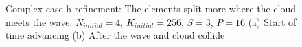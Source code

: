 \begin{figure}[H]
    \centering
    \hfill
    \caption{Complex case h-refinement: The elements split more where the cloud meets the wave.
        \(N_{initial} = 4\), \(K_{initial} = 256\), \(S = 3\), \(P = 16\) (a) Start of time 
        advancing (b) After the wave and cloud collide}\label{fig:cloud_s}
\end{figure}

